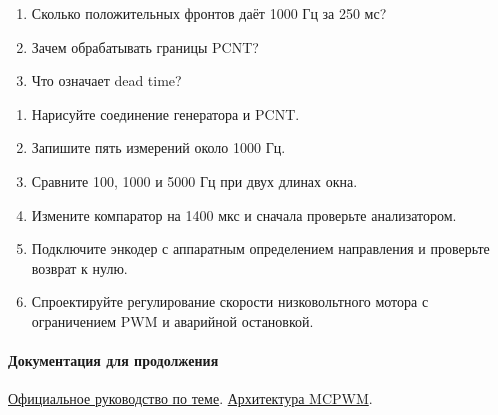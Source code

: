\begin{selfcheck}
\begin{enumerate}
\item Сколько положительных фронтов даёт 1000 Гц за 250 мс?
\item Зачем обрабатывать границы PCNT?
\item Что означает dead time?
\end{enumerate}
\end{selfcheck}
\begin{tasks}
\begin{enumerate}
\item {} Нарисуйте соединение генератора и PCNT.
\item {} Запишите пять измерений около 1000 Гц.
\item {} Сравните 100, 1000 и 5000 Гц при двух длинах окна.
\item {} Измените компаратор на 1400 мкс и сначала проверьте анализатором.
\item {} Подключите энкодер с аппаратным определением направления и проверьте возврат к нулю.
\item {} Спроектируйте регулирование скорости низковольтного мотора с ограничением PWM и аварийной остановкой.
\end{enumerate}
\end{tasks}

\paragraph{Документация для продолжения}\href{https://docs.espressif.com/projects/esp-idf/en/v5.4/esp32s3/api-reference/peripherals/pcnt.html}{Официальное руководство по теме}.
\href{https://docs.espressif.com/projects/esp-idf/en/v5.4/esp32s3/api-reference/peripherals/mcpwm.html}{Архитектура MCPWM}.
